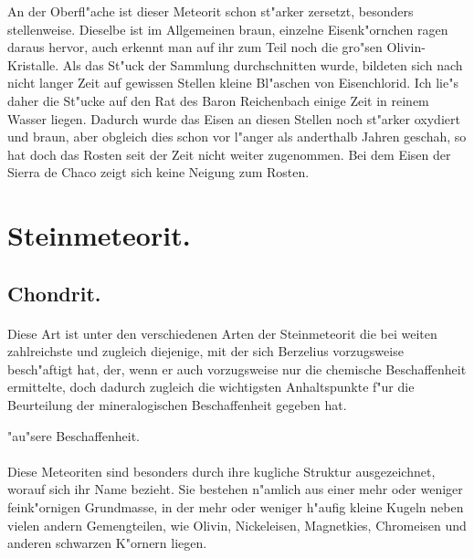 \documentclass[a4paper, 11pt, oneside, german]{article}
\begin{document}
An der Oberfl"ache ist dieser Meteorit schon st"arker zersetzt, besonders stellenweise. Dieselbe ist im Allgemeinen braun, einzelne Eisenk"ornchen ragen daraus hervor, auch erkennt man auf ihr zum Teil noch die gro"sen Olivin-Kristalle. Als das St"uck der Sammlung durchschnitten wurde, bildeten sich nach nicht langer Zeit auf gewissen Stellen kleine Bl"aschen von Eisenchlorid. Ich lie"s daher die St"ucke auf den Rat des Baron Reichenbach einige Zeit in reinem Wasser liegen. Dadurch wurde das Eisen an diesen Stellen noch st"arker oxydiert und braun, aber obgleich dies schon vor l"anger als anderthalb Jahren geschah, so hat doch das Rosten seit der Zeit nicht weiter zugenommen. Bei dem Eisen der Sierra de Chaco zeigt sich keine Neigung zum Rosten.
\clearpage
\section{Steinmeteorit.}
\subsection{Chondrit.}
\paragraph{}
Diese Art ist unter den verschiedenen Arten der Steinmeteorit die bei weiten zahlreichste und zugleich diejenige, mit der sich Berzelius vorzugsweise besch"aftigt hat, der, wenn er auch vorzugsweise nur die chemische Beschaffenheit ermittelte, doch dadurch zugleich die wichtigsten Anhaltspunkte f"ur die Beurteilung der mineralogischen Beschaffenheit gegeben hat.
\begin{center}
"au"sere Beschaffenheit.
\end{center}
\paragraph{}
Diese Meteoriten sind besonders durch ihre kugliche Struktur ausgezeichnet, worauf sich ihr Name bezieht. Sie bestehen n"amlich aus einer mehr oder weniger feink"ornigen Grundmasse, in der mehr oder weniger h"aufig kleine Kugeln neben vielen andern Gemengteilen, wie Olivin, Nickeleisen, Magnetkies, Chromeisen und anderen schwarzen K"ornern liegen.
\end{document}
